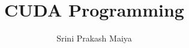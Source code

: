 \documentclass[14pt]{report}
\title{CUDA Programming}
\author{Srini Prakash Maiya}
\begin{document}
\maketitle
\pagebreak
\tableofcontents
\pagebreak



\end{document}
